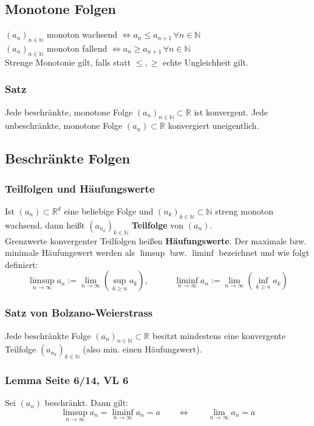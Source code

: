 \documentclass[10pt,a4paper^, twocolumn]{article}
\newcommand{\R}{\mathbb{R}}
\newcommand{\N}{\mathbb{N}}
\begin{document}
\subsection{Monotone Folgen}
	$(a_n)_{n \in \N}$ monoton wachsend $\Leftrightarrow a_n \leq a_{n+1} 
	\, \forall n \in \N$\\
	$(a_n)_{n \in \N}$ monoton fallend $\Leftrightarrow a_n \geq a_{n+1} 
	\, \forall n \in \N$\\
	Strenge Monotonie gilt, falls statt $\leq, \geq$ echte Ungleichheit gilt.\\
	\subsubsection{Satz}
		Jede beschränkte, monotone Folge $(a_n)_{n \in \N} \subset \R$
		ist konvergent.
		Jede unbeschränkte, monotone Folge $(a_n)  \subset \R$ konvergiert 
		uneigentlich.
\subsection{Beschränkte Folgen}
	\subsubsection{Teilfolgen und Häufungswerte}
		Ist $(a_n) \subset \R^d$ eine beliebige Folge und 
		$(n_k)_{k \in \N} \subset \N $ 
		streng monoton wachsend, dann heißt $ (a_{n_k})_{k \in \N}$
		\textbf{Teilfolge} von $(a_n)$.\\
		Grenzwerte konvergenter Teilfolgen heißen \textbf{Häufungswerte}. Der maximale
		bzw. minimale Häufungswert werden als $\limsup$ bzw. $\liminf$ 
		bezeichnet und wie folgt definiert:
		$$ 
		\limsup_{n \to \infty} a_n := 
		\lim_{n \to \infty} \left( \sup_{k \geq n} a_k \right) ,
		\qquad \quad
		\liminf_{n \to \infty} a_n := 
		\lim_{n \to \infty} \left( \inf_{k \geq n} a_k \right)
		$$
	\subsubsection{Satz von Bolzano-Weierstrass}
		Jede beschränkte Folge $(a_n)_{n \in \N} \subset \R$ besitzt
		mindestens eine konvergente Teilfolge $(a_{n_k})_{k \in \N}$ (also min.
		einen Häufungswert).
	\subsubsection{Lemma Seite 6/14, VL 6}
		Sei $(a_n)$ beschränkt. Dann gilt: \\
		$$ \limsup_{n \to \infty} a_n = \liminf_{n \to \infty} a_n = a
		\qquad \Leftrightarrow \qquad
		\lim_{n \to \infty} a_n = a$$
\end{document}
